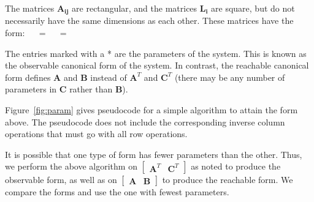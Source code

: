 The matrices $\mathbf{A_{ij}}$ are rectangular, and the matrices
$\mathbf{L_i}$ are square, but do not necessarily have the same
dimensions as each other. These matrices have the form:
\starteqnstar
~~ =  ~~
 = 
\doneeqnstar

The entries marked with a * are the parameters of the system.  This is
known as the observable canonical form of the system. In contrast, the
reachable canonical form defines $\mathbf{A}$ and $\mathbf{B}$ instead
of $\mathbf{A}^T$ and $\mathbf{C}^T$ (there may be any number of
parameters in $\mathbf{C}$ rather than $\mathbf{B}$).

Figure~\ref{fig:param} gives pseudocode for a simple algorithm to
attain the form above.  The pseudocode does not include the
corresponding inverse column operations that must go with all row
operations.

It is possible that one type of form has fewer parameters than the
other. Thus, we perform the above algorithm on $\left [
\begin{array} {cc} \mathbf{A}^T & \mathbf{C}^T
\end{array} \right ]$ as noted to produce the observable form, as well as on $\left [
\begin{array} {cc} \mathbf{A} & \mathbf{B} \end{array} \right
]$ to produce the reachable form.  We compare the forms and use the
one with fewest parameters.

